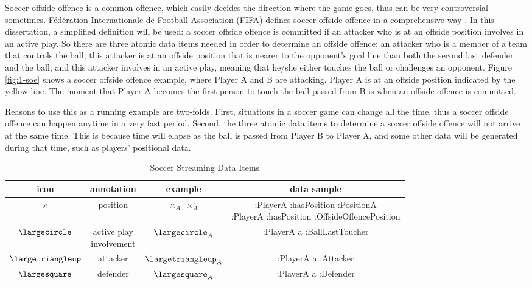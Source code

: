 Soccer offside offence is a common offence, which easily decides the direction where the game goes, thus can be very controversial sometimes.
F\'ed\'eration Internationale de Football Association (FIFA) defines soccer offside offence in a comprehensive way \cite{federation2016laws}. 
In this dissertation, a simplified definition will be used: 
a soccer offside offence is committed if an attacker who is at an offside position involves in an active play. 
So there are three atomic data items needed in order to determine an offside offence:
an attacker who is a member of a team that controls the ball;
this attacker is at an offside position that is nearer to the opponent's goal line than both the second last defender and the ball;
and this attacker involves in an active play, meaning that he/she either touches the ball or challenges an opponent. 
Figure \ref{fig:1-soe} shows a soccer offside offence example, where Player A and B are attacking.
Player A is at an offside position indicated by the yellow line. 
The moment that Player A becomes the first person to touch the ball passed from B is when an offside offence is committed.

Reasons to use this as a running example are two-folds.
First, situations in a soccer game can change all the time, thus a soccer offside offence can happen anytime in a very fast period. 
Second, the three atomic data items to determine a soccer offside offence will not arrive at the same time. 
This is because time will elapse as the ball is passed from Player B to Player A, and some other data will be generated during that time, such as players' positional data.

\begin{table}[!htbp]
	\centering
	\caption{Soccer Streaming Data Items}
	\label{tab:icons}
	\begin{tabular}{|c|c|c|c|} \hline
		icon & annotation & example & data sample \\ \hline
    	$\times$ & position & \makecell{$\times_{A}$ \\ $\times^{\circ}_{A}$} & \makecell{:PlayerA :hasPosition :PositionA \\ :PlayerA :hasPosition :OffsideOffencePosition} \\ \hline 
		$\largecircle$ & \makecell{active play \\involvement} & $\largecircle_{A}$ & :PlayerA a :BallLastToucher \\ \hline
		$\largetriangleup$ & attacker & $\largetriangleup_{A}$ & :PlayerA a :Attacker \\ \hline
		$\largesquare$ & defender & $\largesquare_{A}$ & :PlayerA a :Defender \\ \hline
	\end{tabular}
\end{table}

